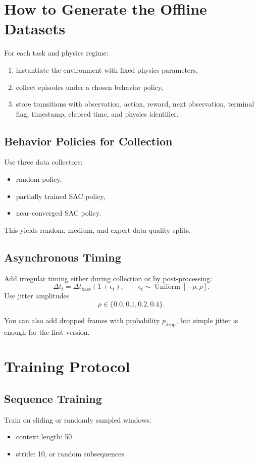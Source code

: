 \documentclass[11pt]{article}
\begin{document}
\section{How to Generate the Offline Datasets}

For each task and physics regime:
\begin{enumerate}[leftmargin=1.5em]
    \item instantiate the environment with fixed physics parameters,
    \item collect episodes under a chosen behavior policy,
    \item store transitions with observation, action, reward, next observation, terminal flag, timestamp, elapsed time, and physics identifier.
\end{enumerate}

\subsection{Behavior Policies for Collection}
Use three data collectors:
\begin{itemize}[leftmargin=1.5em]
    \item random policy,
    \item partially trained SAC policy,
    \item near-converged SAC policy.
\end{itemize}

This yields random, medium, and expert data quality splits.

\subsection{Asynchronous Timing}
Add irregular timing either during collection or by post-processing:
\[
\Delta t_t = \Delta t_{\text{base}}(1 + \epsilon_t), \qquad \epsilon_t \sim \operatorname{Uniform}[-\rho, \rho].
\]
Use jitter amplitudes
\[
\rho \in \{0.0, 0.1, 0.2, 0.4\}.
\]

You can also add dropped frames with probability $p_{\text{drop}}$, but simple jitter is enough for the first version.

\section{Training Protocol}

\subsection{Sequence Training}
Train on sliding or randomly sampled windows:
\begin{itemize}[leftmargin=1.5em]
    \item context length: 50
    \item stride: 10, or random subsequences
\end{itemize}
\end{document}
